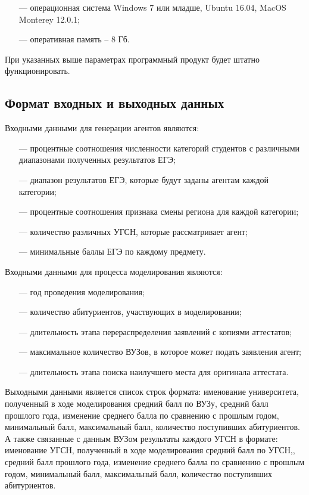 \begin{itemize}[leftmargin=1.6\parindent]
	\item[---] операционная система Windows 7 или младше, Ubuntu 16.04, MacOS Monterey 12.0.1;
	\item[---] оперативная память – 8 Гб.
	
\end{itemize}

При указанных выше параметрах программный продукт будет штатно функционировать.

\subsection{Формат входных и выходных данных}

Входными данными для генерации агентов являются:

\begin{itemize}[leftmargin=1.6\parindent]
	\item[---] процентные соотношения численности категорий студентов с различными диапазонами полученных результатов ЕГЭ;
	\item[---] диапазон результатов ЕГЭ, которые будут заданы агентам каждой категории;
	\item[---] процентные соотношения признака смены региона для каждой категории;
	\item[---] количество различных УГСН, которые рассматривает агент;
	\item[---] минимальные баллы ЕГЭ по каждому предмету.
\end{itemize}

Входными данными для процесса моделирования являются:

\begin{itemize}[leftmargin=1.6\parindent]
	\item[---] год проведения моделирования;
	\item[---] количество абитуриентов, участвующих в моделировании;
	\item[---] длительность этапа перераспределения заявлений с копиями аттестатов;
	\item[---] максимальное количество ВУЗов, в которое может подать заявления агент;
	\item[---] длительность этапа поиска наилучшего места для оригинала аттестата.
	
\end{itemize}

Выходными данными является список строк формата: именование университета, полученный в ходе моделирования средний балл по ВУЗу, средний балл прошлого года, изменение среднего балла по сравнению с прошлым годом, минимальный балл, максимальный балл, количество поступивших абитуриентов. А также связанные с данным ВУЗом результаты каждого УГСН в формате: именование УГСН, полученный в ходе моделирования средний балл по УГСН,, средний балл прошлого года, изменение среднего балла по сравнению с прошлым годом, минимальный балл, максимальный балл, количество поступивших абитуриентов.


